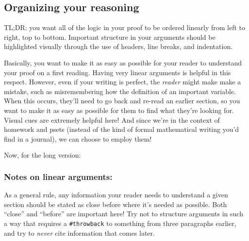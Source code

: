 \documentclass{fkpset}
\begin{document}
\subsection{Organizing your reasoning}
TL;DR: you want all of the logic in your proof to be ordered linearly from left
to right, top to bottom. Important structure in your arguments should be
highlighted visually through the use of headers, line breaks, and indentation.

Basically, you want to make it as easy as possible for your reader to understand
your proof on a first reading. Having very linear arguments is helpful in this
respect. However, even if your writing is perfect, the \emph{reader} might make
make a mistake, such as misremembering how the definition of an important
variable. When this occurs, they'll need to go back and re-read an earlier
section, so you want to make it as easy as possible for them to find what
they're looking for. Visual cues are extremely helpful here! And since we're in
the context of homework and psets (instead of the kind of formal mathematical
writing you'd find in a journal), we can choose to employ them!

Now, for the long version:
\subsubsection{Notes on linear arguments:}
As a general rule, any information your reader needs to understand a given
section should be stated as close before where it's needed as possible. Both
``close'' and ``before'' are important here! Try not to structure arguments in
such a way that requires a \texttt{\#throwback} to something from three
paragraphs earlier, and try to \emph{never} cite information that comes later.
\end{document}
